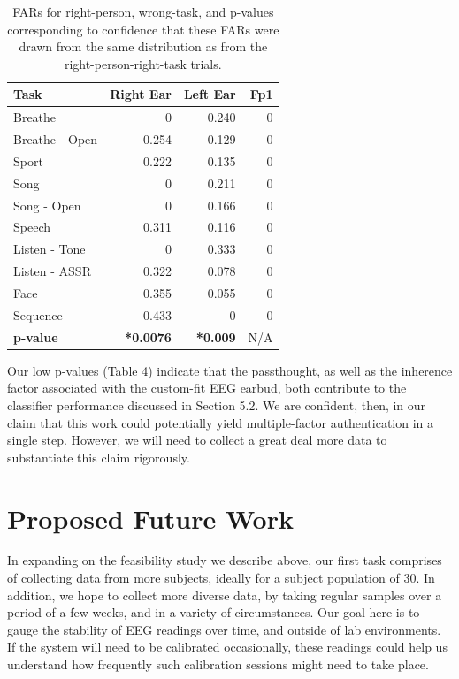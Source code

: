 \documentclass[11pt]{article}
\begin{document}
\begin{table}[h]
\centering
\begin{tabular}{lrrr}
\textbf{Task} & \textbf{Right Ear} & \textbf{Left Ear} & \textbf{Fp1}\\
\hline
Breathe & 0 & 0.240 & 0\\
Breathe - Open & 0.254 & 0.129 & 0\\
Sport & 0.222 & 0.135 & 0\\
Song & 0 & 0.211 & 0\\
Song - Open & 0 & 0.166 & 0\\
Speech & 0.311 & 0.116 & 0\\
Listen - Tone & 0 & 0.333 & 0\\
Listen - ASSR & 0.322 & 0.078 & 0\\
Face & 0.355 & 0.055 & 0\\
Sequence & 0.433 & 0 & 0\\
\hline
\textbf{p-value} & \textbf{*0.0076} & \textbf{*0.009} & N/A\\
\end{tabular}
\caption{FARs for right-person, wrong-task, and p-values corresponding to confidence that these FARs were drawn from the same distribution as from the right-person-right-task trials.}
\end{table}

Our low p-values (Table 4) indicate that the passthought, as well as the inherence
factor associated with the custom-fit EEG earbud, both contribute to the classifier
performance discussed in Section 5.2. We are confident, then, in our claim that this work
could potentially yield multiple-factor authentication in a single step. However, we
will need to collect a great deal more data to substantiate this claim rigorously.

\section{Proposed Future Work}

In expanding on the feasibility study we describe above, 
our first task comprises of collecting data from more subjects,
ideally for a subject population of 30.
In addition, we hope to collect more diverse data,
by taking regular samples over a period of a few weeks,
and in a variety of circumstances. Our goal here is to gauge the stability
of EEG readings over time, and outside of lab environments.
If the system will need to be calibrated occasionally, these readings
could help us understand how frequently such calibration sessions
might need to take place.
\end{document}
